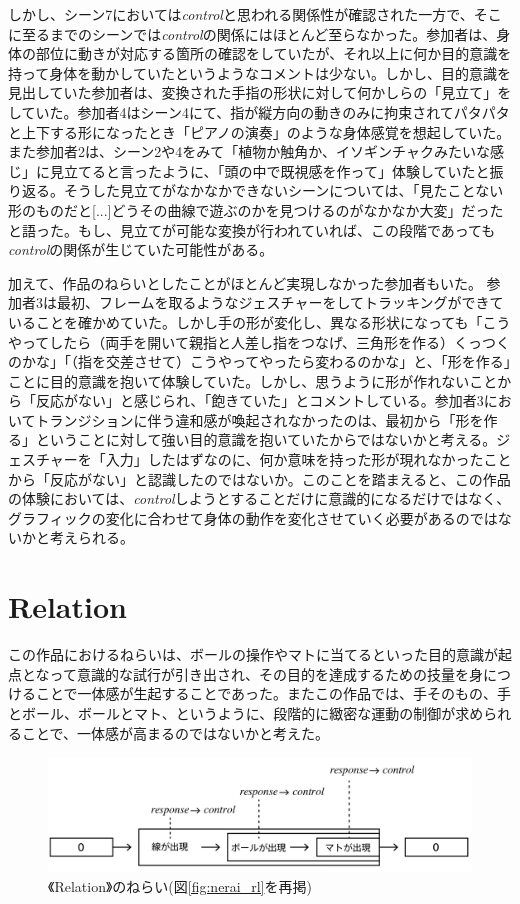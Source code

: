 しかし、シーン7においては\textit{control}と思われる関係性が確認された一方で、そこに至るまでのシーンでは\textit{control}の関係にはほとんど至らなかった。参加者は、身体の部位に動きが対応する箇所の確認をしていたが、それ以上に何か目的意識を持って身体を動かしていたというようなコメントは少ない。しかし、目的意識を見出していた参加者は、変換された手指の形状に対して何かしらの「見立て」をしていた。参加者4はシーン4にて、指が縦方向の動きのみに拘束されてパタパタと上下する形になったとき「ピアノの演奏」のような身体感覚を想起していた。また参加者2は、シーン2や4をみて「植物か触角か、イソギンチャクみたいな感じ」に見立てると言ったように、「頭の中で既視感を作って」体験していたと振り返る。そうした見立てがなかなかできないシーンについては、「見たことない形のものだと[...]どうその曲線で遊ぶのかを見つけるのがなかなか大変」だったと語った。もし、見立てが可能な変換が行われていれば、この段階であっても\textit{control}の関係が生じていた可能性がある。

加えて、作品のねらいとしたことがほとんど実現しなかった参加者もいた。
参加者3は最初、フレームを取るようなジェスチャーをしてトラッキングができていることを確かめていた。しかし手の形が変化し、異なる形状になっても「こうやってしたら（両手を開いて親指と人差し指をつなげ、三角形を作る）くっつくのかな」「（指を交差させて）こうやってやったら変わるのかな」と、「形を作る」ことに目的意識を抱いて体験していた。しかし、思うように形が作れないことから「反応がない」と感じられ、「飽きていた」とコメントしている。参加者3においてトランジションに伴う違和感が喚起されなかったのは、最初から「形を作る」ということに対して強い目的意識を抱いていたからではないかと考える。ジェスチャーを「入力」したはずなのに、何か意味を持った形が現れなかったことから「反応がない」と認識したのではないか。このことを踏まえると、この作品の体験においては、\textit{control}しようとすることだけに意識的になるだけではなく、グラフィックの変化に合わせて身体の動作を変化させていく必要があるのではないかと考えられる。

\section{Relation}
この作品におけるねらいは、ボールの操作やマトに当てるといった目的意識が起点となって意識的な試行が引き出され、その目的を達成するための技量を身につけることで一体感が生起することであった。またこの作品では、手そのもの、手とボール、ボールとマト、というように、段階的に緻密な運動の制御が求められることで、一体感が高まるのではないかと考えた。

\begin{figure}[H]
  \centering
  \includegraphics[width=15cm]{img/nerai_rl.png}
  \caption{《Relation》のねらい(図\ref{fig:nerai_rl}を再掲)}
  \label{fig:nerai_rl_in_discussion}
\end{figure}

